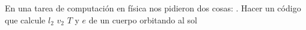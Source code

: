 
En una tarea de computación en física nos pidieron dos cosas: . Hacer un código que calcule $l_2$ $v_2$ $T$ y $e$ de un cuerpo orbitando al sol
